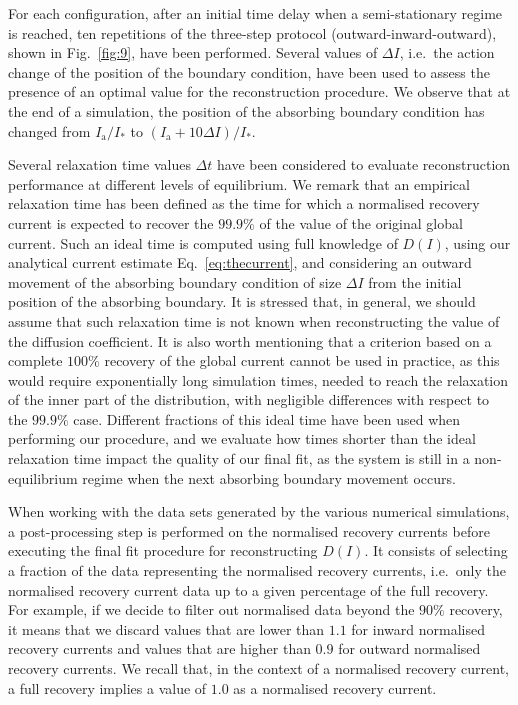 For each configuration, after an initial time delay when a semi-stationary regime is reached, ten repetitions of the three-step protocol (outward-inward-outward), shown in Fig.~\ref{fig:9}, have been performed. Several values of $\Delta I$, i.e.\ the action change of the position of the boundary condition, have been used to assess the presence of an optimal value for the reconstruction procedure. We observe that at the end of a simulation, the position of the absorbing boundary condition has changed from $I_\mathrm{a}/I_\ast$ to $(I_\mathrm{a} + 10\Delta I) / I_\ast$. 

Several relaxation time values $\Delta t$ have been considered to evaluate reconstruction performance at different levels of equilibrium. We remark that an empirical relaxation time has been defined as the time for which a normalised recovery current is expected to recover the $99.9\%$ of the value of the original global current. Such an ideal time is computed using full knowledge of $D(I)$, using our analytical current estimate Eq.~\eqref{eq:thecurrent}, and considering an outward movement of the absorbing boundary condition of size $\Delta I$ from the initial position of the absorbing boundary. It is stressed that, in general, we should assume that such relaxation time is not known when reconstructing the value of the diffusion coefficient. It is also worth mentioning that a criterion based on a complete $100\%$ recovery of the global current cannot be used in practice, as this would require exponentially long simulation times, needed to reach the relaxation of the inner part of the distribution, with negligible differences with respect to the $99.9\%$ case. Different fractions of this ideal time have been used when performing our procedure, and we evaluate how times shorter than the ideal relaxation time impact the quality of our final fit, as the system is still in a non-equilibrium regime when the next absorbing boundary movement occurs.

When working with the data sets generated by the various numerical simulations, a post-processing step is performed on the normalised recovery currents before executing the final fit procedure for reconstructing $D(I)$. It consists of selecting a fraction of the data representing the normalised recovery currents, i.e.\ only the normalised recovery current data up to a given percentage of the full recovery. For example, if we decide to filter out normalised data beyond the $90\%$ recovery, it means that we discard values that are lower than $1.1$ for inward normalised recovery currents and values that are higher than $0.9$ for outward normalised recovery currents. We recall that, in the context of a normalised recovery current, a full recovery implies a value of $1.0$ as a normalised recovery current.

